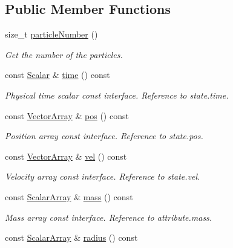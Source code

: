 \subsection*{Public Member Functions}
\begin{DoxyCompactItemize}
\item 
size\+\_\+t \mbox{\hyperlink{classparticle_system_a859f7ca9a229b8b934ba1de2607b878a}{particle\+Number}} ()
\begin{DoxyCompactList}\small\item\em Get the number of the particles. \end{DoxyCompactList}\item 
const \mbox{\hyperlink{classparticle_system_a3938954186247e3eab01cc75fcc62b40}{Scalar}} \& \mbox{\hyperlink{classparticle_system_a25bf169b4acd1ede1dd03a218d5f105c}{time}} () const
\begin{DoxyCompactList}\small\item\em Physical time scalar const interface. Reference to state.\+time. \end{DoxyCompactList}\item 
const \mbox{\hyperlink{classparticle_system_ac8049667a0d05e76b836642503a71c12}{Vector\+Array}} \& \mbox{\hyperlink{classparticle_system_a7a4b29e872ff56670d6ad553df57b22b}{pos}} () const
\begin{DoxyCompactList}\small\item\em Position array const interface. Reference to state.\+pos. \end{DoxyCompactList}\item 
const \mbox{\hyperlink{classparticle_system_ac8049667a0d05e76b836642503a71c12}{Vector\+Array}} \& \mbox{\hyperlink{classparticle_system_a4609f37fb9055bc71f14dbf6738017ba}{vel}} () const
\begin{DoxyCompactList}\small\item\em Velocity array const interface. Reference to state.\+vel. \end{DoxyCompactList}\item 
const \mbox{\hyperlink{classparticle_system_a7f143d2466bd0f78d79cccd3493a756b}{Scalar\+Array}} \& \mbox{\hyperlink{classparticle_system_a8adc16a716e231f9840dd7f7e063f656}{mass}} () const
\begin{DoxyCompactList}\small\item\em Mass array const interface. Reference to attribute.\+mass. \end{DoxyCompactList}\item 
const \mbox{\hyperlink{classparticle_system_a7f143d2466bd0f78d79cccd3493a756b}{Scalar\+Array}} \& \mbox{\hyperlink{classparticle_system_aed99ea79678f0233119ebc28d2b9822d}{radius}} () const

\end{DoxyCompactItemize}
